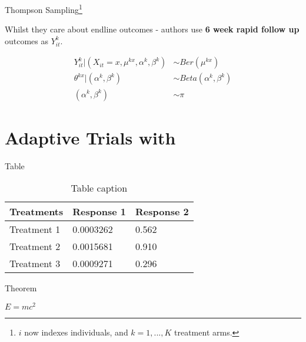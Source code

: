 \documentclass[aspectratio=169,xcolor=dvipsnames]{beamer}
\begin{document}
\begin{frame}{Thompson Sampling\footnote{$i$ now indexes individuals, and $k = 1, ..., K$ treatment arms.}}

    Whilst they care about endline outcomes - authors use \textbf{6 week rapid follow up} outcomes as
    $Y_{it}^k$.

    \begin{align*}
       Y_{it}^k | (X_{it} = x, \mu^{kx}, \alpha^k, \beta^k) &\sim Ber(\mu^{kx}) \\
       \theta^{kx} | (\alpha^k, \beta^k) &\sim Beta(\alpha^k, \beta^k) \\
       (\alpha^k, \beta^k) &\sim \pi
    \end{align*}

\end{frame}
\section{Adaptive Trials with}

\begin{frame}{Table}
    \begin{table}
        \begin{tabular}{l l l}
            \toprule
            \textbf{Treatments} & \textbf{Response 1} & \textbf{Response 2} \\
            \midrule
            Treatment 1         & 0.0003262           & 0.562               \\
            Treatment 2         & 0.0015681           & 0.910               \\
            Treatment 3         & 0.0009271           & 0.296               \\
            \bottomrule
        \end{tabular}
        \caption{Table caption}
    \end{table}
\end{frame}


\begin{frame}{Theorem}
    \begin{theorem}
        $E = mc^2$
    \end{theorem}
\end{frame}

\end{document}
